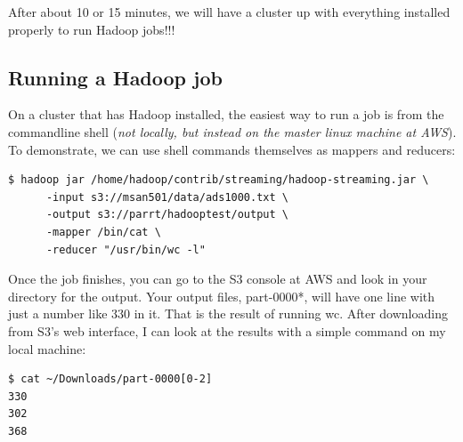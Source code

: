\begin{fullwidth}
\begin{center}
\end{center}

After about 10 or 15 minutes, we will have a cluster up with everything installed properly to run Hadoop jobs!!!
 
\subsection{Running a Hadoop job}

On a cluster that has Hadoop installed, the easiest way to run a job is from the commandline shell ({\em not locally, but instead on the master linux machine at AWS}). To demonstrate, we can use shell commands themselves as mappers and reducers:

\begin{lstlisting}[style=BashInputStyle]
$ hadoop jar /home/hadoop/contrib/streaming/hadoop-streaming.jar \
      -input s3://msan501/data/ads1000.txt \
      -output s3://parrt/hadooptest/output \
      -mapper /bin/cat \
      -reducer "/usr/bin/wc -l"	
\end{lstlisting}

\noindent Once the job finishes, you can go to the S3 console at AWS and look in your directory for the output. Your output files, part-0000*, will have one line with just a number like 330 in it. That is the result of running wc. After downloading from S3's web interface, I can look at the results with a simple command on my local machine:

\begin{lstlisting}[style=BashInputStyle]
$ cat ~/Downloads/part-0000[0-2]
330	
302	
368
\end{lstlisting}

\begin{center}
\end{center}
~\\


\end{fullwidth}
